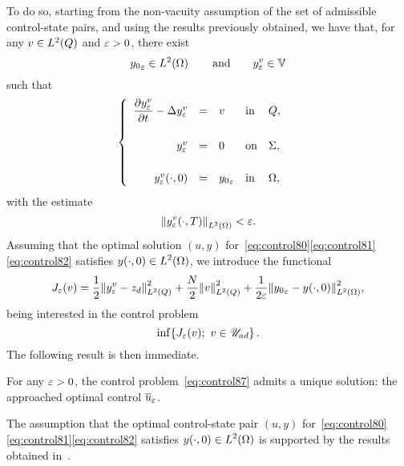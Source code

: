 To do so, starting from the non-vacuity assumption of the set of admissible
control-state pairs, and using the results previously obtained, we have
that, for any $v\in L^{2}\!\left({Q}\right)$ and $\varepsilon > 0$, there exist
\begin{equation*}
    {y_{0}}_{\varepsilon}\in L^{2}\!\left({\Omega}\right)\qquad\text{and}\qquad y_{\varepsilon}^{v}\in
    \mathbb{V}
\end{equation*}
such that
\begin{equation*}
    \begin{cases}\displaystyle
        \begin{array}{rclll}
            \dfrac{\partial{}y_{\varepsilon}^{v}}{\partial{}t} - \Delta y_{\varepsilon}^{v} & = & v &
            \text{in} & Q,\\
            \\
            y_{\varepsilon}^{v} & = & 0 & \text{on} & \Sigma,\\
            \\
            {y_{\varepsilon}^{v}}\!\left({\cdot, 0}\right) & = & {y_{0}}_{\varepsilon} &
            \text{in} & \Omega,
        \end{array}
    \end{cases}
\end{equation*}
with the estimate
\begin{equation*}
    \normeohm{%
        \condfinale{y_{\veps}^{v}}
    } < \veps.
\end{equation*}
Assuming that the optimal solution $(u,y)$
for~\eqref{eq:control80}\eqref{eq:control81}\eqref{eq:control82} satisfies
$\displaystyle {y}\!\left({\cdot, 0}\right)\in L^{2}\!\left({\Omega}\right)$, we introduce the
functional
\begin{equation*}
    J_{\varepsilon}(v) = \dfrac{1}{2}{\left\|{y_{\varepsilon}^{v} - z_{d} }\right\|}_{L^{2}\left({Q}\right)}^{2} +
    \dfrac{N}{2}{\left\|{v }\right\|}_{L^{2}\left({Q}\right)}^{2} + \dfrac{1}{2\varepsilon}{\left\|{{y_{0}}_{\varepsilon} -
    {y}\!\left({\cdot, 0}\right) }\right\|}_{L^{2}\left({\Omega}\right)}^{2},
\end{equation*}
being interested in the control problem
\begin{equation}\label{eq:control87}
    \inf\!\left\{{%
        J_{\veps}(v);\ v\in\uad
    }\right\}.
\end{equation}
The following result is then immediate.

\begin{proposition}%
    For any $\varepsilon > 0$, the control problem~\eqref{eq:control87} admits a
    unique solution: the approached optimal control ${\overline{u}}_{\varepsilon}$.
\end{proposition}

\begin{remarque}%
    The assumption that the optimal control-state pair $(u,y)$
    for~\eqref{eq:control80}\eqref{eq:control81}\eqref{eq:control82}
    satisfies $\displaystyle {y}\!\left({\cdot, 0}\right)\in L^{2}\!\left({\Omega}\right)$ is
    supported by the results obtained in~\cite{dorville}.
\end{remarque}

